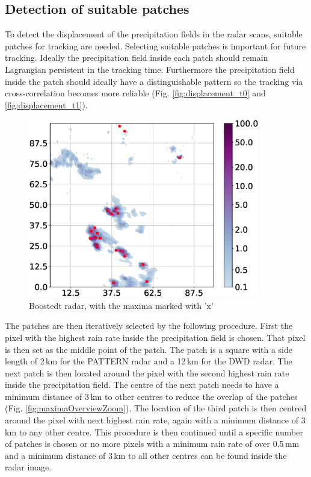 \documentclass[11pt,twoside,a4paper,fleqn,x11names]{report}
\numberwithin{equation}{chapter}
\numberwithin{figure}{chapter}
\numberwithin{table}{chapter}
\begin{document}
\subsection{Detection of suitable patches}
To detect the displacement of the precipitation fields in the radar scans, suitable patches for tracking are needed. Selecting suitable patches is important for future tracking. Ideally the precipitation field inside each patch should remain Lagrangian persistent in the tracking time. Furthermore the precipitation field inside the patch should ideally have a distinguishable pattern so the  tracking via cross-correlation becomes more reliable (Fig. \ref{fig:displacement_t0} and \ref{fig:displacement_t1}). 
\begin{figure}[H]
	\centering
	\includegraphics[width=0.9\textwidth]{maximaOverview.eps}
	\caption{Boostedt radar, with the maxima marked with 'x'}
	\label{fig:maximaOverview}
\end{figure}
The patches are then iteratively selected by the following procedure. First the pixel with the highest rain rate inside the precipitation field is chosen. That pixel is then set as the middle point of the patch. The patch is a square with a side length of 2\,km for the PATTERN radar and a 12\,km for the DWD radar. The next patch is then located around the pixel with the second highest rain rate inside the precipitation field. The centre of the next patch needs to have a  minimum distance of 3\,km to other centres to reduce the overlap of the patches (Fig. \ref{fig:maximaOverviewZoom}). The location of the third patch is then centred around the pixel with next highest rain rate, again with a minimum distance of 3\,km to any other centre. This procedure is then continued until a specific number of patches is chosen or no more pixels with a minimum rain rate of over 0.5\,mm and a minimum distance of 3\,km to all other centres can be found inside the radar image.
\end{document}
